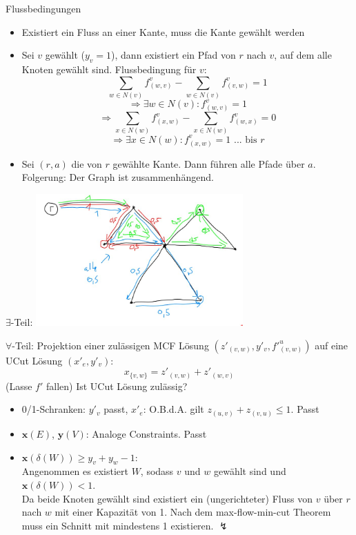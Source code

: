 \documentclass[ngerman,aspectratio=169,10pt]{beamer}
\begin{document}
\begin{frame}{Flussbedingungen}
    \begin{itemize}
        \item Existiert ein Fluss an einer Kante, muss die Kante gewählt werden
        \item Sei $v$ gewählt ($y_v=1$), dann existiert ein Pfad von $r$ nach $v$, auf dem alle Knoten gewählt sind. Flussbedingung für $v$:
        \[\sum_{w\in N(v)} f^v_{(w,v)} - \sum_{w\in N(v)} f^v_{(v,w)}=1\]
        \[\Rightarrow\exists w\in N(v):f^v_{(w,v)}=1\]
        \[\Rightarrow \sum_{x\in N(w)} f^v_{(x,w)} - \sum_{x\in N(w)} f^v_{(w,x)}=0\]
        \[\Rightarrow \exists x\in N(w):f^v_{(x,w)}=1\text{~... bis~}r\]
        \item Sei $(r,a)$ die von $r$ gewählte Kante. Dann führen alle Pfade über $a$.\\
        Folgerung: Der Graph ist zusammenhängend.
    \end{itemize}
\end{frame}

\begin{frame}{$\exists$-Teil:}
    \centering
    \includegraphics[width=300px]{invalid.jpg}
\end{frame}

\begin{frame}{$\forall$-Teil:}
    Projektion einer zulässigen MCF Lösung $(z'_{(v,w)}, y'_v,f'^u_{(v,w)})$ auf eine UCut Lösung $(x'_e, y'_v)$:
    \[x_{\{v,w\}}=z'_{(v,w)}+z'_{(w,v)}\]
    (Lasse $f'$ fallen) Ist UCut Lösung zulässig?
    \begin{itemize}
        \item 0/1-Schranken: $y'_v$ passt, $x'_e$: O.B.d.A. gilt $z_{(u,v)}+z_{(v,u)}\leq1$. Passt
        \item $\pmb{x}(E)$, $\pmb{y}(V)$: Analoge Constraints. Passt
        \item $\pmb{x}(\delta(W))\geq y_v+y_w-1$:\\
        Angenommen es existiert $W$, sodass $v$ und $w$ gewählt sind und $\pmb{x}(\delta(W))<1$.\\
        Da beide Knoten gewählt sind existiert ein (ungerichteter) Fluss von $v$ über $r$ nach $w$ mit einer Kapazität von 1. Nach dem max-flow-min-cut Theorem muss ein Schnitt mit mindestens 1 existieren. \hfill\mbox{\Large{$\lightning$}}
    \end{itemize}
\end{frame}
\end{document}

